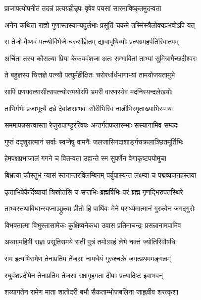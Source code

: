 \twolineshloka
{प्राजापत्योपनीतं तदन्नं प्रत्यग्रहीन्नृपः}
{वृषेव पयसां सारमाविष्कृतमुदन्वता} %

\twolineshloka
{अनेन कथिता राज्ञो गुणास्तस्यान्यदुर्लभाः}
{प्रसूतिं चकमे तस्मिंस्त्रैलोक्यप्रभवोऽपि यत्} %

\twolineshloka
{स तेजो वैष्णवं पत्न्योर्विभेजे चरुसंज्ञितम्}
{द्यावापृथिव्योः प्रत्यग्रमहर्पतिरिवातपम्} %

\twolineshloka
{अर्चिता तस्य कौसल्या प्रिया केकयवंशजा}
{अतः सम्भावितां ताभ्यां सुमित्रामैच्छदीश्वरः} %

\twolineshloka
{ते बहुज्ञस्य चित्तज्ञे पत्न्यौ पत्युर्महीक्षितः}
{चरोरर्धार्धभागाभ्यां तामयोजयतामुभे} %

\twolineshloka
{सापि प्रणयवत्यासीत्सपत्न्योरुभयोरपि}
{भ्रमरी वारणस्येव मदनिस्यन्दलेखयोः} %

\twolineshloka
{ताभिर्गर्भः प्रजाभूत्यै दध्रे देवांशसम्भवः}
{सौरीभिरिव नाडीभिरमृताख्याभिरम्मयः} %

\twolineshloka
{सममापन्नसत्त्वास्ता रेजुरापाण्डुरत्विषः}
{अन्तर्गतफलारम्भाः सस्यानामिव सम्पदः} %

\twolineshloka
{गुप्तं ददृशुरात्मानं सर्वाः स्वप्नेषु वामनैः}
{जलजासिगदाशार्ङ्गचक्रलाञ्छितमूर्तिभिः} %

\twolineshloka
{हेमपक्षप्रभाजालं गगने च वितन्वता}
{उह्यन्ते स्म सुपर्णेन वेगाकृष्टपयोमुचा} %

\twolineshloka
{बिभ्रत्या कौस्तुभं न्यासं स्तनान्तरविलम्बिनम्}
{पर्युपास्यन्त लक्ष्म्या च पद्मव्यजनहस्तया} %

\twolineshloka
{कृताभिषेकैर्दिव्यायां त्रिस्रोतसि च सप्तभिः}
{ब्रह्मर्षिभिः परं ब्रह्म गृणद्भिरुपतस्थिरे} %

\twolineshloka
{ताभ्यस्तथाविधान्स्वप्नाञ्छ्रुत्वा प्रीतो हि पार्थिवः}
{मेने परार्ध्यमात्मानं गुरुत्वेन जगद्गुरोः} %

\twolineshloka
{विभक्तात्मा विभुस्तासामेकः कुक्षिष्वनेकधा}
{उवास प्रतिमाचन्द्रः प्रसन्नानामपामिव} %

\twolineshloka
{अथाग्रमहिषी राज्ञः प्रसूतिसमये सती}
{पुत्रं तमोऽपहं लेभे नक्तं ज्योतिरिवौषधिः} %

\twolineshloka
{राम इत्यभिरामेण तेनाप्रतिम तेजसा}
{नामधेयं गुरुश्चक्रे जगत्प्रथममङ्गलम्} %

\twolineshloka
{रघुवंशप्रदीपेन तेनाप्रतिम तेजसा}
{रक्षागृहगता दीपाः प्रत्यादिष्ट इवाभवन्} %

\twolineshloka
{शय्यागतेन रामेण माता शातोदरी बभौ}
{सैकताम्भोजबलिना जाह्नवीव शरत्कृशा} %

